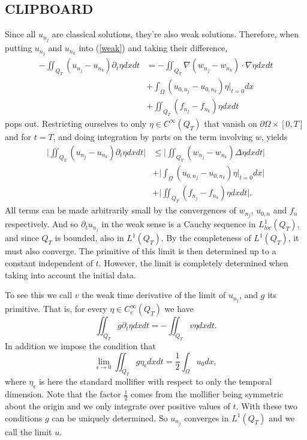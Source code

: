 \documentclass[11pt, a4paper]{article}
\begin{document}
\begin{appendices}
\section{CLIPBOARD}
Since all $u_{n_j}$ are classical solutions, they're also weak solutions. Therefore, when putting $u_{n_j}$ and $u_{n_k}$ into (\ref{weak}) and taking their difference, 
	\begin{align*}
	-\iint_{Q_T}(u_{n_j} - u_{n_k})\partial_t \eta dxdt &= -\iint_{Q_T}\nabla(w_{n_j} - w_{n_k})\cdot \nabla \eta dxdt \\
	&+ \int_\Omega (u_{0,n_j} - u_{0,n_k})\eta\big|_{t=0}dx \\
	&+ \iint_{Q_T}(f_{n_j} - f_{n_k})\eta dxdt 
	\end{align*}	 
	pops out. Restricting ourselves to only $\eta \in C^\infty(Q_T)$ that vanish on $\partial \Omega \times [0,T]$ and for $t=T$, and doing integration by parts on the term involving $w$, yields
	\begin{align*}
	\bigg|\iint_{Q_T}(u_{n_j} - u_{n_k})\partial_t \eta dxdt \bigg| &\leq \bigg|\iint_{Q_T} (w_{n_j} - w_{n_k})\Delta\eta dxdt \bigg| \\
	&+ \bigg| \int_\Omega (u_{0,n_j} - u_{0,n_k})\eta\big|_{t=0} dx \bigg| \\
	 &+  \bigg|\iint_{Q_T}(f_{n_j} - f_{n_k})\eta dxdt\bigg|.
	\end{align*}
	 All terms can be made arbitrarily small by the convergences of $w_{n_j}$, $u_{0,n}$ and $f_n$ respectively. And so $\partial_t u_{n_j}$ in the weak sense is a Cauchy sequence in $L^1_{loc}(Q_T)$, and since $Q_T$ is bounded, also in $L^1(Q_T)$. By the completeness of $L^1(Q_T)$, it must also converge. The primitive of this limit is then determined up to a constant independent of $t$. However, the limit is completely determined when taking into account the initial data.
	 
	 To see this we call $v$ the weak time derivative of the limit of $u_{n_j}$, and $g$ its primitive. That is, for every $\eta \in C^\infty_c (Q_T)$ we have
	 \begin{equation*}
	 \iint_{Q_T} g\partial_t\eta dxdt = -\iint_{Q_T}v\eta dxdt.
	 \end{equation*}
	 In addition we impose the condition that
	 \begin{equation*}
	 \lim_{\epsilon \to 0} \iint_{Q_T}g \eta_\epsilon dxdt = \frac{1}{2}\int_\Omega u_0dx,
	 \end{equation*}
	 where $\eta_\epsilon$ is here the standard mollifier with respect to only the temporal dimension. Note that the factor $\frac{1}{2}$ comes from the mollifier being symmetric about the origin and we only integrate over positive values of $t$. With these two conditions $g$ can be uniquely determined. So $u_{n_j}$ converges in $L^1(Q_T)$ and we call the limit $u$.	 
	 

\end{appendices}
\end{document}
